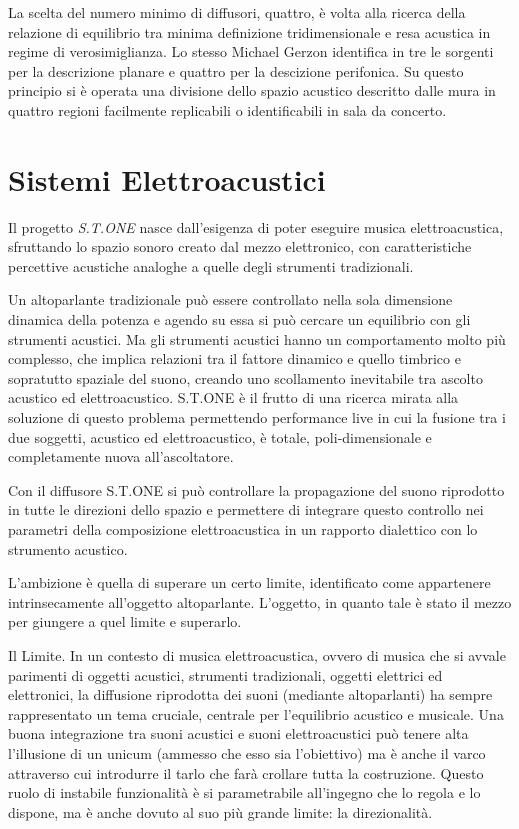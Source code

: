 La scelta del numero minimo di diffusori, quattro, è volta alla ricerca della relazione di equilibrio tra
minima definizione tridimensionale e resa acustica in regime di verosimiglianza. Lo stesso Michael Gerzon
identifica in tre le sorgenti per la descrizione planare e quattro per la descizione perifonica.
Su questo principio si è operata una divisione dello spazio acustico descritto dalle mura in quattro regioni facilmente 
replicabili o identificabili in sala da concerto.

\section{Sistemi Elettroacustici}

Il progetto \emph{S.T.ONE} nasce dall'esigenza di poter eseguire musica elettroacustica,
sfruttando lo spazio sonoro creato dal mezzo elettronico, con caratteristiche percettive
acustiche analoghe a quelle degli strumenti tradizionali.

Un altoparlante tradizionale può essere controllato nella sola dimensione dinamica della
potenza e agendo su essa si può cercare un equilibrio con gli strumenti acustici.
Ma gli strumenti acustici hanno un comportamento molto più complesso, che implica relazioni
tra il fattore dinamico e quello timbrico e sopratutto spaziale del suono, creando uno
scollamento inevitabile tra ascolto acustico ed elettroacustico. S.T.ONE è il frutto di
una ricerca mirata alla soluzione di questo problema permettendo performance live in cui
la fusione tra i due soggetti, acustico ed elettroacustico, è totale, poli-dimensionale e completamente nuova all'ascoltatore. 

Con il diffusore S.T.ONE si può controllare la propagazione del suono riprodotto in tutte
le direzioni dello spazio e permettere di integrare questo controllo nei parametri della
composizione elettroacustica in un rapporto dialettico con lo strumento acustico.

L'ambizione è quella di superare un certo limite, identificato come appartenere intrinsecamente
all'oggetto altoparlante. L'oggetto, in quanto tale è stato il mezzo per giungere a quel limite e superarlo.

Il Limite. In un contesto di musica elettroacustica, ovvero di musica che si avvale parimenti
di oggetti acustici, strumenti tradizionali, oggetti elettrici ed elettronici, la diffusione
riprodotta dei suoni (mediante altoparlanti) ha sempre rappresentato un tema cruciale,
centrale per l'equilibrio acustico e musicale. Una buona integrazione tra suoni acustici
e suoni elettroacustici può tenere alta l'illusione di un unicum (ammesso che esso sia l'obiettivo)
ma è anche il varco attraverso cui introdurre il tarlo che farà crollare tutta la costruzione.
Questo ruolo di instabile funzionalità è si parametrabile all'ingegno che lo regola e lo dispone,
ma è anche dovuto al suo più grande limite: la direzionalità.

